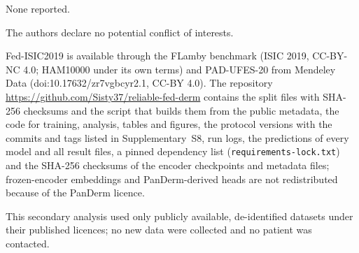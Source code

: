 \documentclass[VANCOUVER,Times1COL]{WileyNJDv5}
\begin{document}

None reported. %

The authors declare no potential conflict of interests.

Fed-ISIC2019 is available through the FLamby benchmark (ISIC 2019, CC-BY-NC 4.0; HAM10000 under its own
terms) and PAD-UFES-20 from Mendeley Data (doi:10.17632/zr7vgbcyr2.1, CC-BY 4.0). The repository
\url{https://github.com/Sisty37/reliable-fed-derm} contains the split files with SHA-256 checksums and the
script that builds them from the public metadata, the code for training, analysis, tables and figures,
the protocol versions with the commits and tags listed in Supplementary~S8, run logs, the predictions of every model and
all result files, a pinned dependency list (\texttt{requirements-lock.txt}) and the SHA-256 checksums of the
encoder checkpoints and metadata files; frozen-encoder embeddings and PanDerm-derived heads are not redistributed because of the
PanDerm licence. %

This secondary analysis used only publicly available, de-identified datasets under their published
licences; no new data were collected and no patient was contacted. %

\end{document}
